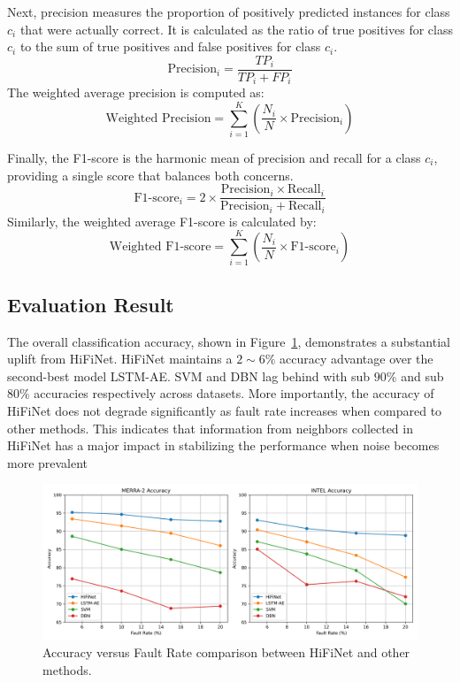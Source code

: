 Next, precision measures the proportion of positively predicted instances for class \(c_i\) that were actually correct. It is calculated as the ratio of true positives for class \(c_i\) to the sum of true positives and false positives for class \(c_i\).
\begin{equation}
\text{Precision}_i = \frac{TP_i}{TP_i + FP_i}
\end{equation}
The weighted average precision is computed as:
\begin{equation}
\text{Weighted Precision} = \sum_{i=1}^{K} \left( \frac{N_i}{N} \times \text{Precision}_i \right)
\end{equation}

Finally, the F1-score is the harmonic mean of precision and recall for a class \(c_i\), providing a single score that balances both concerns.
\begin{equation}
\text{F1-score}_i = 2 \times \frac{\text{Precision}_i \times \text{Recall}_i}{\text{Precision}_i + \text{Recall}_i}
\end{equation}
Similarly, the weighted average F1-score is calculated by:
\begin{equation}
\text{Weighted F1-score} = \sum_{i=1}^{K} \left( \frac{N_i}{N} \times \text{F1-score}_i \right)
\end{equation}


\subsection{Evaluation Result}

The overall classification accuracy, shown in Figure~\ref{fig:accuracy}, demonstrates a substantial uplift from HiFiNet. HiFiNet maintains a \(2\sim6\%\) accuracy advantage over the second-best model LSTM-AE. SVM and DBN lag behind with sub \(90\%\) and sub \(80\%\) accuracies respectively across datasets. More importantly, the accuracy of HiFiNet does not degrade significantly as fault rate increases when compared to other methods. This indicates that information from neighbors collected in HiFiNet has a major impact in stabilizing the performance when noise becomes more prevalent

\begin{figure}
\centering
\includegraphics[width=\linewidth]{images/accuracy.png}
\caption{Accuracy versus Fault Rate comparison between HiFiNet and other methods.}
\label{fig:accuracy}
\end{figure}

